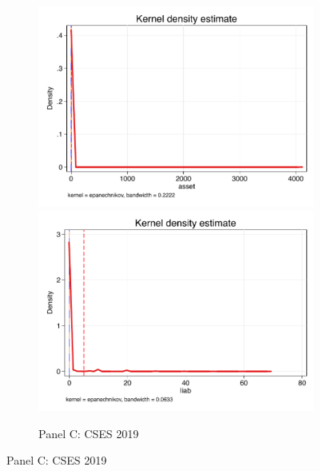 \documentclass[11pt,letterpaper]{article}
\begin{document}
\begin{figure}[H]
\begin{subfigure}[b]{0.33\linewidth}
		\vspace{-2.5em}
		\newline {}
		\includegraphics[width=1\linewidth]{../../empirical/CSES2017/Appendix/Graphs/t_kden_asset} 
		\vspace{-2.5em}
		\newline {}
		\includegraphics[width=1\linewidth]{../../empirical/CSES2017/Appendix/Graphs/t_kden_liab} 
		\vspace{-2.5em}
		\newline {}
	\end{subfigure}
	\hfil
	\begin{subfigure}[b]{0.33\linewidth}
		\caption*{Panel C: CSES 2019} \vspace{-.5em}

\end{subfigure}
\end{figure}
\end{document}
